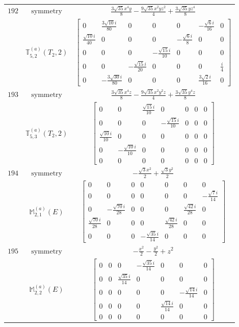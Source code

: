 \documentclass[fleqn,8pt,landscape]{jsarticle}
\begin{document}
\begin{longtable}{ccc}
$ 192 $ & $ \text{symmetry} $ & $ \frac{3 \sqrt{35} x^{4} y}{8} - \frac{9 \sqrt{35} x^{2} y z^{2}}{4} + \frac{3 \sqrt{35} y z^{4}}{8} $ \\
$  $ & $ \mathbb{T}_{5,2}^{(a)}(T_{2},2) $ & $ \begin{bmatrix} 0 & \frac{3 \sqrt{10} i}{80} & 0 & 0 & 0 & - \frac{\sqrt{6} i}{16} & 0 \\ \frac{\sqrt{10} i}{40} & 0 & 0 & 0 & - \frac{\sqrt{6} i}{8} & 0 & 0 \\ 0 & 0 & 0 & - \frac{\sqrt{15} i}{10} & 0 & 0 & 0 \\ 0 & 0 & - \frac{\sqrt{15} i}{20} & 0 & 0 & 0 & \frac{i}{4} \\ 0 & - \frac{3 \sqrt{30} i}{80} & 0 & 0 & 0 & \frac{3 \sqrt{2} i}{16} & 0 \end{bmatrix} $ \\ \hline
$ 193 $ & $ \text{symmetry} $ & $ \frac{3 \sqrt{35} x^{4} z}{8} - \frac{9 \sqrt{35} x^{2} y^{2} z}{4} + \frac{3 \sqrt{35} y^{4} z}{8} $ \\
$  $ & $ \mathbb{T}_{5,3}^{(a)}(T_{2},2) $ & $ \begin{bmatrix} 0 & 0 & \frac{\sqrt{15} i}{10} & 0 & 0 & 0 & 0 \\ 0 & 0 & 0 & - \frac{\sqrt{15} i}{10} & 0 & 0 & 0 \\ \frac{\sqrt{10} i}{10} & 0 & 0 & 0 & 0 & 0 & 0 \\ 0 & - \frac{\sqrt{10} i}{10} & 0 & 0 & 0 & 0 & 0 \\ 0 & 0 & 0 & 0 & 0 & 0 & 0 \end{bmatrix} $ \\ \hline
$ 194 $ & $ \text{symmetry} $ & $ - \frac{\sqrt{3} x^{2}}{2} + \frac{\sqrt{3} y^{2}}{2} $ \\
$  $ & $ \mathbb{M}_{2,1}^{(a)}(E) $ & $ \begin{bmatrix} 0 & 0 & 0 & 0 & 0 & 0 & 0 \\ 0 & 0 & 0 & 0 & 0 & 0 & - \frac{\sqrt{7} i}{14} \\ 0 & - \frac{\sqrt{70} i}{28} & 0 & 0 & 0 & \frac{\sqrt{42} i}{28} & 0 \\ \frac{\sqrt{70} i}{28} & 0 & 0 & 0 & \frac{\sqrt{42} i}{28} & 0 & 0 \\ 0 & 0 & 0 & - \frac{\sqrt{35} i}{14} & 0 & 0 & 0 \end{bmatrix} $ \\ \hline
$ 195 $ & $ \text{symmetry} $ & $ - \frac{x^{2}}{2} - \frac{y^{2}}{2} + z^{2} $ \\
$  $ & $ \mathbb{M}_{2,2}^{(a)}(E) $ & $ \begin{bmatrix} 0 & 0 & 0 & - \frac{\sqrt{35} i}{14} & 0 & 0 & 0 \\ 0 & 0 & \frac{\sqrt{35} i}{14} & 0 & 0 & 0 & 0 \\ 0 & 0 & 0 & 0 & 0 & - \frac{\sqrt{14} i}{14} & 0 \\ 0 & 0 & 0 & 0 & \frac{\sqrt{14} i}{14} & 0 & 0 \\ 0 & 0 & 0 & 0 & 0 & 0 & 0 \end{bmatrix} $ \\ \hline

\end{longtable}
\end{document}

